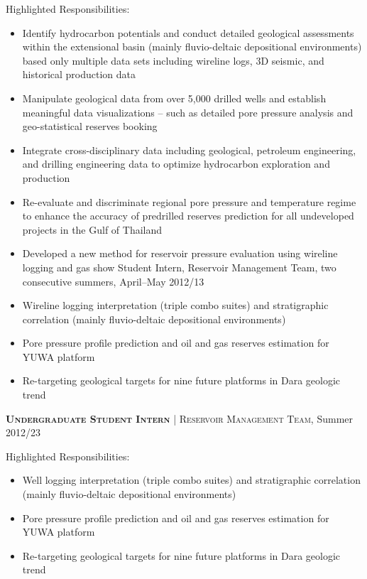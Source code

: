 \documentclass[10pt]{article}
\begin{document}
\bigskip
Highlighted Responsibilities:
\begin{itemize}[leftmargin=*]
    \item Identify hydrocarbon potentials and conduct detailed geological assessments within the extensional basin (mainly fluvio-deltaic depositional environments) based only multiple data sets including wireline logs, 3D seismic, and historical production data
    \item Manipulate geological data from over 5,000 drilled wells and establish meaningful data visualizations – such as detailed pore pressure analysis and geo-statistical reserves booking
    \item Integrate cross-disciplinary data including geological, petroleum engineering, and drilling engineering data to optimize hydrocarbon exploration and production
    \item Re-evaluate and discriminate regional pore pressure and temperature regime to enhance the accuracy of predrilled reserves prediction for all undeveloped projects in the Gulf of Thailand
    \item Developed a new method for reservoir pressure evaluation using wireline logging and gas show
Student Intern, Reservoir Management Team, two consecutive summers, April–May 2012/13
    \item Wireline logging interpretation (triple combo suites) and stratigraphic correlation (mainly fluvio-deltaic depositional environments)
    \item Pore pressure profile prediction and oil and gas reserves estimation for YUWA platform
    \item Re-targeting geological targets for nine future platforms in Dara geologic trend
\end{itemize}

\textsc{\textbf{Undergraduate Student Intern}} | \textsc{Reservoir Management Team}, Summer 2012/23

\bigskip
Highlighted Responsibilities:
\begin{itemize}[leftmargin=*]
    \item Well logging interpretation (triple combo suites) and stratigraphic correlation (mainly fluvio-deltaic depositional environments)
    \item Pore pressure profile prediction and oil and gas reserves estimation for YUWA platform
    \item Re-targeting geological targets for nine future platforms in Dara geologic trend


\end{itemize}
\end{document}
